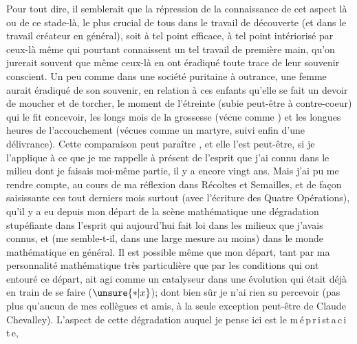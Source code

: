 Pour tout dire, il semblerait que la répression de la connaissance de cet aspect là
ou de ce stade-là, le plus crucial de tous\deleted{\unsure{,}} dans le travail de découverte
(et dans le travail créateur en général), soit à tel point efficace, à tel point intériorisé
par ceux-là même qui pourtant connaissent un tel travail de première main, qu'on jurerait souvent
que même ceux-là  en ont éradiqué toute trace de leur souvenir conscient.
Un peu comme dans une société puritaine à outrance, une femme aurait éradiqué de son souvenir,
 en relation à ces enfants qu'elle se fait un devoir de moucher
et de torcher, le moment de l'étreinte (subie peut-être à contre-coeur) qui le fit concevoir,
les longs mois de la grossesse\deleted{\unsure{,}} (vécue comme )
et les longues heures de l'accouchement (vécues comme un martyre,
suivi enfin d'une délivrance).
Cette comparaison peut paraître , et elle l'est peut-être,
si je l'applique à ce que je me rappelle à présent de l'esprit que j'ai connu dans le milieu
dont je faisais moi-même partie, il y a encore vingt ans.
Mais  j'ai pu me rendre compte, au cours de ma réflexion
dans Récoltes et Semailles, et de façon saisissante ces tout derniers mois surtout
(avec l'écriture des Quatre Opérations), qu'il y a eu depuis mon départ de la scène mathématique
une  dégradation stupéfiante dans l'esprit qui aujourd'hui fait loi dans les milieux
que j'avais connus, et (me semble-t-il, dans une large mesure au moins) dans le monde mathématique en général.
Il est possible même que mon départ, tant par ma personnalité mathématique très particulière
que par les conditions qui ont entouré ce départ, ait agi comme un catalyseur dans une évolution
qui était déjà en train de se faire ($\unsure{*|x}$); 
dont bien sûr je n'ai rien su percevoir (pas plus qu'aucun de mes collègues et amis,
à la seule exception peut-être de Claude Chevalley).
L'aspect de cette dégradation
auquel je pense ici est le 
m\,é\,p\,r\,i\,s\quad t\,a\,c\,i\,t\,e,
